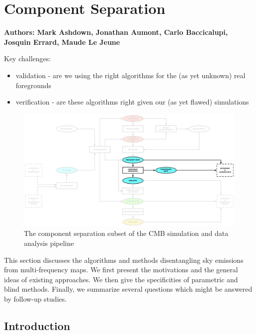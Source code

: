           
\section{Component Separation}

\textbf{ Authors: Mark Ashdown, Jonathan Aumont, Carlo Baccicalupi, Josquin Errard, Maude Le Jeune}

Key challenges:
\begin{itemize}
\item validation - are we using the right algorithms for the (as yet unknown) real foregrounds
\item verification - are these algorithms right given our (as yet flawed) simulations
\end{itemize}

\begin{figure}[htbp]
\centering
\includegraphics[width=1\textwidth]{Analysis/cs}
\caption{The component separation subset of the CMB simulation and data analysis pipeline}
\label{fig:general_comp_sep_scheme}
\end{figure}

This section discusses the algorithms and methods disentangling sky emissions from multi-frequency maps. 
We first present the motivations and the general ideas of existing approaches. 
We then give the specificities of parametric and blind methods. 
Finally, we summarize several questions which might be answered by follow-up studies.

\subsection{Introduction}

